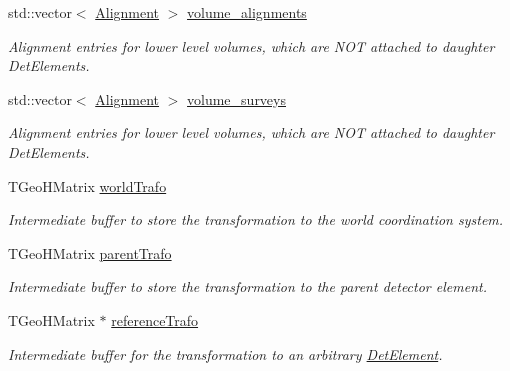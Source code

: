 \begin{DoxyCompactItemize}
std::vector$<$ \hyperlink{class_d_d4hep_1_1_alignments_1_1_alignment}{Alignment} $>$ \hyperlink{class_d_d4hep_1_1_geometry_1_1_det_element_object_a549c814b4adf2d5897234ccd24186fb1}{volume\_\-alignments}
\begin{DoxyCompactList}\small\item\em Alignment entries for lower level volumes, which are NOT attached to daughter DetElements. \item\end{DoxyCompactList}\item 
std::vector$<$ \hyperlink{class_d_d4hep_1_1_alignments_1_1_alignment}{Alignment} $>$ \hyperlink{class_d_d4hep_1_1_geometry_1_1_det_element_object_a7fdbe44b6eee280dc2197b7627c2012e}{volume\_\-surveys}
\begin{DoxyCompactList}\small\item\em Alignment entries for lower level volumes, which are NOT attached to daughter DetElements. \item\end{DoxyCompactList}\item 
TGeoHMatrix \hyperlink{class_d_d4hep_1_1_geometry_1_1_det_element_object_ae6ff583186272de915842f8fb9603590}{worldTrafo}
\begin{DoxyCompactList}\small\item\em Intermediate buffer to store the transformation to the world coordination system. \item\end{DoxyCompactList}\item 
TGeoHMatrix \hyperlink{class_d_d4hep_1_1_geometry_1_1_det_element_object_a3d0d575da80e9a118c5e36f53e265339}{parentTrafo}
\begin{DoxyCompactList}\small\item\em Intermediate buffer to store the transformation to the parent detector element. \item\end{DoxyCompactList}\item 
TGeoHMatrix $\ast$ \hyperlink{class_d_d4hep_1_1_geometry_1_1_det_element_object_af2931f218ee37465cdc62733306d15f3}{referenceTrafo}
\begin{DoxyCompactList}\small\item\em Intermediate buffer for the transformation to an arbitrary \hyperlink{class_d_d4hep_1_1_geometry_1_1_det_element}{DetElement}. \item\end{DoxyCompactList}\item 

\end{DoxyCompactItemize}
